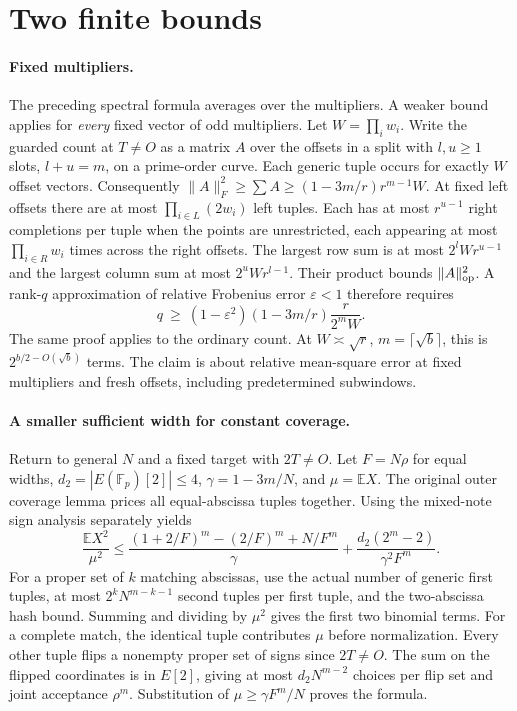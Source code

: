 \documentclass[11pt]{article}
\newcommand{\E}{\mathbb E}
\begin{document}
\section{Two finite bounds}
\paragraph{Fixed multipliers.}
The preceding spectral formula averages over the multipliers. A weaker
bound applies for \emph{every} fixed vector of odd multipliers. Let
$W=\prod_iw_i$. Write the guarded count at $T\ne O$ as a matrix $A$ over
the offsets in a split with $l,u\ge1$ slots, $l+u=m$, on a prime-order
curve. Each generic tuple occurs for exactly $W$ offset vectors.
Consequently $\|A\|_F^2\ge\sum A\ge(1-3m/r)r^{m-1}W$.
At fixed left offsets there are at most $\prod_{i\in L}(2w_i)$
left tuples. Each has at most $r^{u-1}$ right completions per tuple
when the points are unrestricted, each appearing at most
$\prod_{i\in R}w_i$ times across the right offsets.
The largest row sum is at most $2^lWr^{u-1}$ and the largest column
sum at most $2^uWr^{l-1}$. Their product bounds $\|A\|_{\rm op}^2$.
A rank-$q$ approximation of relative Frobenius error $\varepsilon<1$
therefore requires
\[
 q\ \ge\ (1-\varepsilon^2)(1-3m/r)\frac{r}{2^mW}.
\]
The same proof applies to the ordinary count. At $W\asymp\sqrt r$,
$m=\lceil\sqrt b\rceil$, this is $2^{b/2-O(\sqrt b)}$ terms.
The claim is about relative mean-square error at fixed multipliers
and fresh offsets, including predetermined subwindows.

\paragraph{A smaller sufficient width for constant coverage.}
Return to general $N$ and a fixed target with $2T\ne O$. Let $F=N\rho$
for equal widths, $d_2=|E(\mathbb F_p)[2]|\le4$, $\gamma=1-3m/N$,
and $\mu=\E X$. The original outer coverage lemma prices all equal-abscissa
tuples together. Using the mixed-note sign analysis separately yields
\[
 \frac{\E X^2}{\mu^2}\le
 \frac{(1+2/F)^m-(2/F)^m+N/F^m}{\gamma}
 +\frac{d_2(2^m-2)}{\gamma^2 F^m}.
\]
For a proper set of $k$ matching abscissas, use the actual number of
generic first tuples, at most $2^kN^{m-k-1}$ second tuples per first
tuple, and the two-abscissa hash bound. Summing and dividing by
$\mu^2$ gives the first two binomial terms. For a complete match,
the identical tuple contributes $\mu$ before normalization. Every
other tuple flips a nonempty proper set of signs since $2T\ne O$.
The sum on the flipped coordinates is in $E[2]$, giving at most
$d_2N^{m-2}$ choices per flip set and joint acceptance $\rho^m$.
Substitution of $\mu\ge\gamma F^m/N$ proves the formula.
\end{document}
